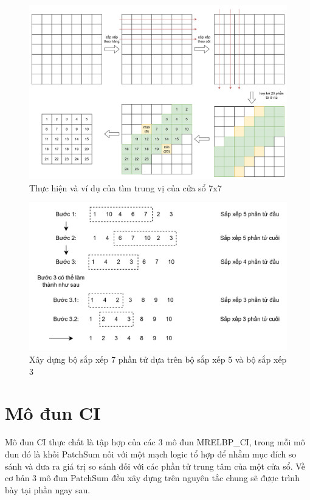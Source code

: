 \begin{figure}[!ht]
	\centering
	\includegraphics[width=\linewidth]{figures/median7x7Example.png}
	\caption{Thực hiện và ví dụ của tìm trung vị của cửa sổ 7x7}
	\label{fig:median7x7Example}
\end{figure}
\begin{figure}[!ht]
	\centering
	\includegraphics[width=0.8\linewidth]{figures/sortAscending7x7Ex.png}
	\caption{Xây dựng bộ sắp xếp 7 phần tử dựa trên bộ sắp xếp 5 và bộ sắp xếp 3}
	\label{fig:sortAscending7x7Ex}
\end{figure}

\section{Mô đun CI}
Mô đun CI thực chất là tập hợp của các 3 mô đun MRELBP\_CI, trong mỗi mô đun đó là khối PatchSum nối với một mạch logic tổ hợp để nhằm mục đích so sánh và đưa ra giá trị so sánh đối với các phần tử trung tâm của một cửa sổ. Về cơ bản 3 mô đun PatchSum đều xây dựng trên nguyên tắc chung sẽ được trình bày tại phần ngay sau.
